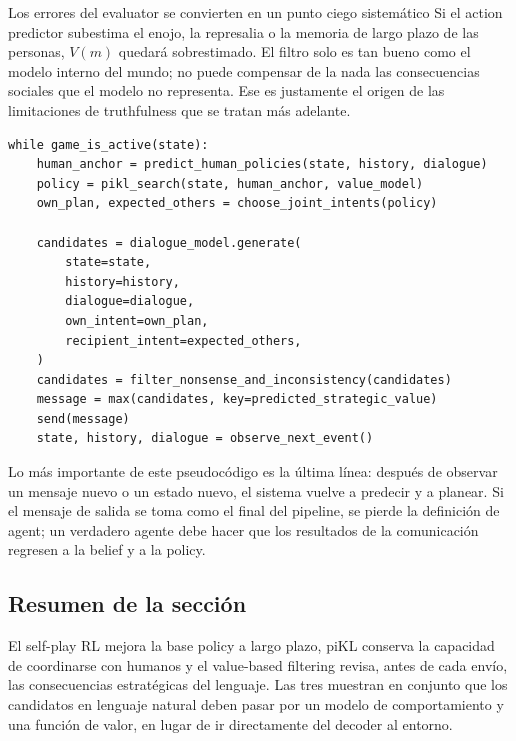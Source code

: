 \begin{warningbox}{Los errores del evaluator se convierten en un punto ciego sistemático}
Si el action predictor subestima el enojo, la represalia o la memoria de largo plazo de las personas, $V(m)$ quedará sobrestimado. El filtro solo es tan bueno como el modelo interno del mundo; no puede compensar de la nada las consecuencias sociales que el modelo no representa. Ese es justamente el origen de las limitaciones de truthfulness que se tratan más adelante.
\end{warningbox}

\begin{lstlisting}[caption={Cicero-style strategic dialogue closed loop},label={lst:cicero-loop}]
while game_is_active(state):
    human_anchor = predict_human_policies(state, history, dialogue)
    policy = pikl_search(state, human_anchor, value_model)
    own_plan, expected_others = choose_joint_intents(policy)

    candidates = dialogue_model.generate(
        state=state,
        history=history,
        dialogue=dialogue,
        own_intent=own_plan,
        recipient_intent=expected_others,
    )
    candidates = filter_nonsense_and_inconsistency(candidates)
    message = max(candidates, key=predicted_strategic_value)
    send(message)
    state, history, dialogue = observe_next_event()
\end{lstlisting}

Lo más importante de este pseudocódigo es la última línea: después de observar un mensaje nuevo o un estado nuevo, el sistema vuelve a predecir y a planear. Si el mensaje de salida se toma como el final del pipeline, se pierde la definición de agent; un verdadero agente debe hacer que los resultados de la comunicación regresen a la belief y a la policy.

\subsection{Resumen de la sección}

El self-play RL mejora la base policy a largo plazo, piKL conserva la capacidad de coordinarse con humanos y el value-based filtering revisa, antes de cada envío, las consecuencias estratégicas del lenguaje. Las tres muestran en conjunto que los candidatos en lenguaje natural deben pasar por un modelo de comportamiento y una función de valor, en lugar de ir directamente del decoder al entorno.
